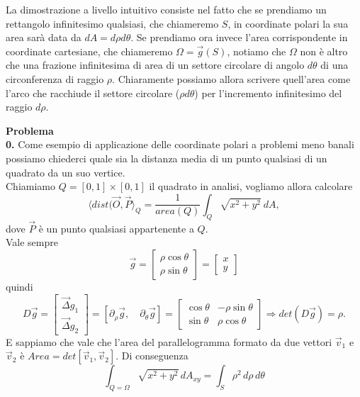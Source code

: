 \documentclass[10pt]{article}
\theoremstyle{plain}
\theoremstyle{definition}
\begin{document}
La dimostrazione a livello intuitivo consiste nel fatto che se prendiamo un rettangolo infinitesimo qualsiasi, che chiameremo $S$, in coordinate polari la sua area sarà data da $dA=d\rho d\theta$. Se prendiamo ora invece l'area corrispondente in coordinate cartesiane, che chiameremo $\Omega = \vec{g} (S)$, notiamo che $\Omega$ non è altro che una frazione infinitesima di area di un settore circolare di angolo $d\theta$ di una circonferenza di raggio $\rho$. Chiaramente possiamo allora scrivere quell'area come l'arco che racchiude il settore circolare ($\rho d\theta$) per l'incremento infinitesimo del raggio $d\rho$. 


\bigskip

\textbf{Problema}\\
\textbf{0.}
\newline
Come esempio di applicazione delle coordinate polari a problemi meno banali possiamo chiederci quale sia la distanza media di un punto qualsiasi di un quadrato da un suo vertice.
\\ Chiamiamo $Q=[0,1]\times [0,1]$ il quadrato in analisi, vogliamo allora calcolare 
$$\langle dist(\vec{O}, \vec{P} \rangle _Q = \frac{1}{area(Q)}\int_Q \sqrt{x^2+y^2}\ dA, $$ dove $\vec{P}$ è un punto qualsiasi appartenente a $Q$.
\\ Vale sempre 
\begin{equation*}
\vec{g}=
\begin{bmatrix}
\rho \cos{\theta}\\
\rho \sin{\theta}
\end{bmatrix}   
=
\begin{bmatrix}
x\\
y
\end{bmatrix}   
\end{equation*}
quindi
$$D\vec{g}=
\begin{bmatrix} 
\vec{\Delta}g_1 \\
\vec{\Delta}g_2
\end{bmatrix}
= [ \partial_{\rho}\vec{g} , \quad \partial_{\theta}\vec{g}] = \begin{bmatrix} 
\cos{\theta} & -\rho\sin{\theta} \\
\sin{\theta} & \rho\cos{\theta}
\end{bmatrix} 
\Rightarrow det (D\vec{g})=\rho.$$ 
E sappiamo che vale che l'area del parallelogramma formato da due vettori $\vec{v}_1$ e $\vec{v}_2$ è $Area = det[\vec{v}_1 , \vec{v}_2]$.
Di conseguenza
$$\int_{Q=\Omega} \sqrt{x^2+y^2} \,dA_{xy} = \int_S \rho^2 \,d\rho \,d\theta$$ \\
\end{document}
